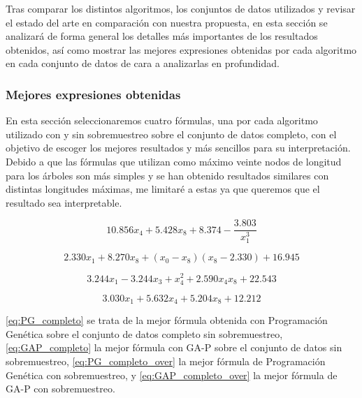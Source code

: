 Tras comparar los distintos algoritmos, los conjuntos de datos utilizados y revisar el estado del arte en comparación con nuestra propuesta, en esta sección se analizará de forma general los detalles más importantes de los resultados obtenidos, así como mostrar las mejores expresiones obtenidas por cada algoritmo en cada conjunto de datos de cara a analizarlas en profundidad.

\subsubsection{Mejores expresiones obtenidas}

En esta sección seleccionaremos cuatro fórmulas, una por cada algoritmo utilizado con y sin sobremuestreo sobre el conjunto de datos completo, con el objetivo de escoger los mejores resultados y más sencillos para su interpretación. Debido a que las fórmulas que utilizan como máximo veinte nodos de longitud para los árboles son más simples y se han obtenido resultados similares con distintas longitudes máximas, me limitaré a estas ya que queremos que el resultado sea interpretable.

\begin{equation} \label{eq:PG_completo}
10.856 x_{4} + 5.428 x_{8} + 8.374 - \frac{3.803}{x_{1}^{3}}
\end{equation}


\begin{equation} \label{eq:GAP_completo}
2.330 x_{1} + 8.270 x_{8} + \left(x_{0} - x_{8}\right) \left(x_{8} - 2.330\right) + 16.945
\end{equation}


\begin{equation} \label{eq:PG_completo_over}
3.244 x_{1} - 3.244 x_{3} + x_{4}^{2} + 2.590 x_{4} x_{8} + 22.543
\end{equation}


\begin{equation} \label{eq:GAP_completo_over}
3.030 x_{1} + 5.632 x_{4} + 5.204 x_{8} + 12.212
\end{equation}

\ref{eq:PG_completo} se trata de la mejor fórmula obtenida con Programación Genética sobre el conjunto de datos completo sin sobremuestreo, \ref{eq:GAP_completo} la mejor fórmula con GA-P sobre el conjunto de datos sin sobremuestreo, \ref{eq:PG_completo_over} la mejor fórmula de Programación Genética con sobremuestreo, y \ref{eq:GAP_completo_over} la mejor fórmula de GA-P con sobremuestreo.

